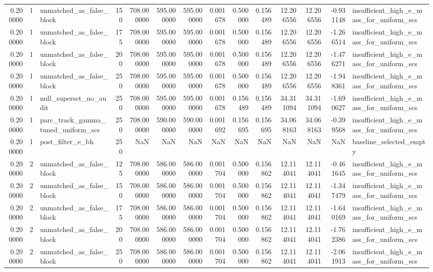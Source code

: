 \begin{tabular}{rrlrrrrrrrrrrl}
0.200000 & 1 & unmatched_as_false_block & 150 & 708.000000 & 595.000000 & 595.000000 & 0.001678 & 0.500000 & 0.156489 & 12.206556 & 12.206556 & -0.931148 & insufficient_high_e_mass_for_uniform_scs \\
0.200000 & 1 & unmatched_as_false_block & 175 & 708.000000 & 595.000000 & 595.000000 & 0.001678 & 0.500000 & 0.156489 & 12.206556 & 12.206556 & -1.266514 & insufficient_high_e_mass_for_uniform_scs \\
0.200000 & 1 & unmatched_as_false_block & 200 & 708.000000 & 595.000000 & 595.000000 & 0.001678 & 0.500000 & 0.156489 & 12.206556 & 12.206556 & -1.476271 & insufficient_high_e_mass_for_uniform_scs \\
0.200000 & 1 & unmatched_as_false_block & 250 & 708.000000 & 595.000000 & 595.000000 & 0.001678 & 0.500000 & 0.156489 & 12.206556 & 12.206556 & -1.948361 & insufficient_high_e_mass_for_uniform_scs \\
0.200000 & 1 & null_superset_no_audit & 250 & 708.000000 & 595.000000 & 595.000000 & 0.001678 & 0.156489 & 0.156489 & 34.311094 & 34.311094 & -1.690627 & insufficient_high_e_mass_for_uniform_scs \\
0.200000 & 1 & parc_track_gamma_tuned_uniform_scs & 250 & 708.000000 & 590.000000 & 590.000000 & 0.001692 & 0.156695 & 0.156695 & 34.068163 & 34.068163 & -0.399568 & insufficient_high_e_mass_for_uniform_scs \\
0.200000 & 1 & post_filter_e_bh & 250 & NaN & NaN & NaN & NaN & NaN & NaN & NaN & NaN & NaN & baseline_selected_empty \\
0.200000 & 2 & unmatched_as_false_block & 125 & 708.000000 & 586.000000 & 586.000000 & 0.001704 & 0.500000 & 0.156862 & 12.114041 & 12.114041 & -0.461645 & insufficient_high_e_mass_for_uniform_scs \\
0.200000 & 2 & unmatched_as_false_block & 150 & 708.000000 & 586.000000 & 586.000000 & 0.001704 & 0.500000 & 0.156862 & 12.114041 & 12.114041 & -1.347479 & insufficient_high_e_mass_for_uniform_scs \\
0.200000 & 2 & unmatched_as_false_block & 175 & 708.000000 & 586.000000 & 586.000000 & 0.001704 & 0.500000 & 0.156862 & 12.114041 & 12.114041 & -1.640169 & insufficient_high_e_mass_for_uniform_scs \\
0.200000 & 2 & unmatched_as_false_block & 200 & 708.000000 & 586.000000 & 586.000000 & 0.001704 & 0.500000 & 0.156862 & 12.114041 & 12.114041 & -1.762386 & insufficient_high_e_mass_for_uniform_scs \\
0.200000 & 2 & unmatched_as_false_block & 250 & 708.000000 & 586.000000 & 586.000000 & 0.001704 & 0.500000 & 0.156862 & 12.114041 & 12.114041 & -2.061913 & insufficient_high_e_mass_for_uniform_scs \\

\end{tabular}

